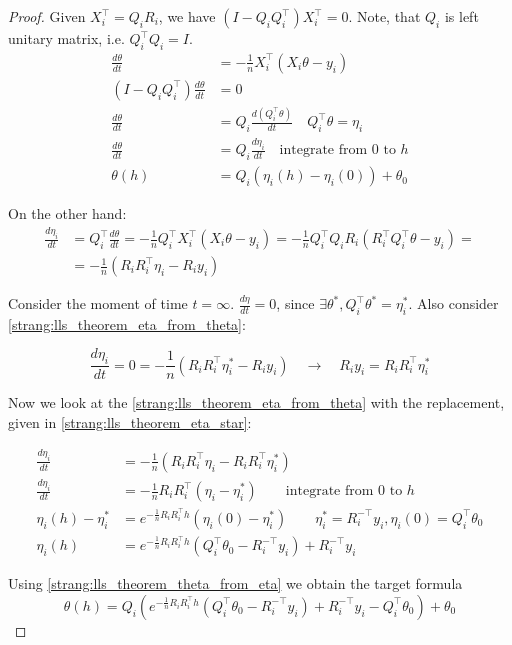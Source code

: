 \documentclass{article}
\begin{document}
\begin{proof}
Given $X_i^\top = Q_i R_i$, we have $(I - Q_iQ_i^\top)X_i^\top = 0$. Note, that $Q_i$ is left unitary matrix, i.e. $Q_i^\top Q_i = I$. 
\begin{align}
\nonumber \frac{d \theta}{d t} &= - \frac{1}{n} X_i^\top( X_i \theta - y_i) \\
\nonumber (I - Q_iQ_i^\top)\frac{d \theta}{d t} &= 0 \\
\nonumber \frac{d \theta}{d t} &= Q_i\frac{d (Q_i^\top\theta)}{d t} \quad Q_i^\top \theta = \eta_i\\ 
\nonumber \frac{d \theta}{d t} &= Q_i\frac{d \eta_i}{d t} \quad \text{integrate from $0$ to $h$}\\ 
\label{strang:lls_theorem_theta_from_eta}\theta(h) &= Q_i \left(\eta_i(h) - \eta_i(0) \right) + \theta_0
\end{align}

On the other hand:
\begin{align}\nonumber
\frac{d \eta_i}{d t} &= Q_i^\top\frac{d \theta}{d t} =  - \frac{1}{n} Q_i^\top  X_i^\top( X_i \theta - y_i) = - \frac{1}{n} Q_i^\top  Q_i R_i( R_i^\top Q_i^\top \theta - y_i) =\\ 
&= - \frac{1}{n} \left( R_iR_i^\top \eta_i - R_i y_i\right) \label{strang:lls_theorem_eta_from_theta}
\end{align}

Consider the moment of time $t = \infty$. $\frac{d \eta}{d t} = 0$, since $\exists \theta^*, Q_i^\top \theta^* = \eta_i^*$. Also consider \ref{strang:lls_theorem_eta_from_theta}:

\begin{equation}\label{strang:lls_theorem_eta_star}
\frac{d \eta_i}{d t} = 0 = - \frac{1}{n} \left( R_iR_i^\top \eta_i^* - R_i y_i\right) \quad \rightarrow \quad R_i y_i = R_iR_i^\top \eta_i^*
\end{equation}

Now we look at the \ref{strang:lls_theorem_eta_from_theta} with the replacement, given in \ref{strang:lls_theorem_eta_star}:

\begin{align*}
\frac{d \eta_i}{d t} &= - \frac{1}{n} \left( R_iR_i^\top \eta_i- R_iR_i^\top \eta_i^*\right) \\
\frac{d \eta_i}{d t} &= - \frac{1}{n} R_iR_i^\top \left( \eta_i- \eta_i^*\right) \qquad \text{integrate from $0$ to $h$} \\
\eta_i(h) - \eta_i^* &= e^{- \frac{1}{n} R_iR_i^\top h} (\eta_i(0) - \eta_i^*) \qquad \eta_i^* = R_i^{-\top}y_i, \eta_i(0) = Q_i^\top \theta_0 \\ 
\eta_i(h) &= e^{- \frac{1}{n} R_iR_i^\top h} (Q_i^\top \theta_0 - R_i^{-\top}y_i) + R_i^{-\top}y_i 
\end{align*}

Using \ref{strang:lls_theorem_theta_from_eta} we obtain the target formula
$$
\theta(h) = Q_i \left(e^{- \frac{1}{n} R_iR_i^\top h} (Q_i^\top \theta_0 - R_i^{-\top}y_i) + R_i^{-\top}y_i - Q_i^\top \theta_0 \right) + \theta_0
$$

\end{proof}
\end{document}
